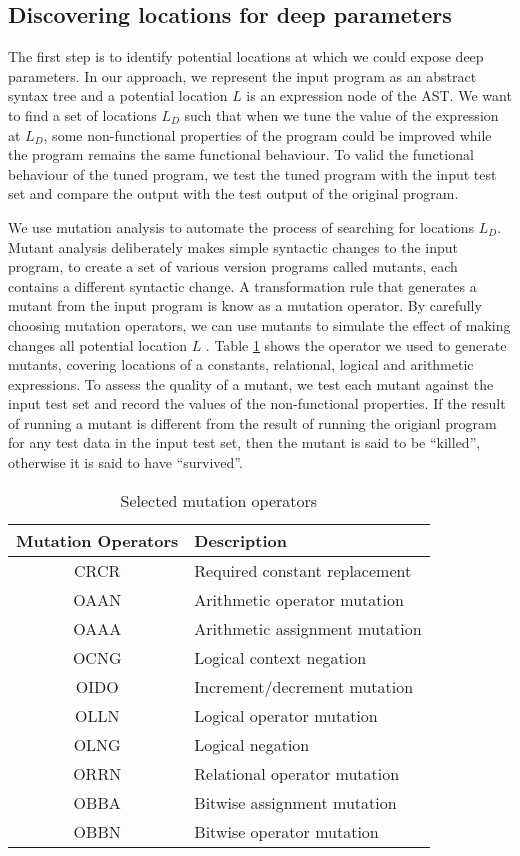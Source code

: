 
\subsection{Discovering locations for deep parameters}

The first step is to identify potential locations at which we could expose deep parameters. 
In our approach, we represent the input program as an abstract syntax tree and a potential location $L$ is an expression node of the AST. 
We want to find a set of locations $L_D$ such that when we tune the value of the expression at $L_D$, some non-functional properties of the program could be improved while the program remains the same functional behaviour. 
To valid the functional behaviour of the tuned program, we test the tuned program with the input test set and compare the output with the test output of the original program.

We use mutation analysis to automate the process of searching for locations $L_D$. Mutant analysis deliberately makes simple syntactic changes to the input program, to create a set of various version programs called mutants, each contains a different syntactic change. A transformation rule that generates a mutant from the input program is know as a mutation operator. By carefully choosing mutation operators, we can use mutants to simulate the effect of making changes all potential location $L$ . Table \ref{tab:cmop} shows the operator we used to generate mutants, covering locations of a constants, relational, logical and arithmetic expressions. 
To assess the quality of a mutant, we test each mutant against the input test set and record the values of the non-functional properties. If the result of running a mutant is different from the result of running the origianl program for any test data in the input test set, then the mutant is said to be ``killed'', otherwise it is said to have ``survived''. 

\begin{table} [htbp]
\caption{Selected mutation operators}
\label{tab:cmop} 
\begin{center}
\begin{tabular}{ | c | l |}
  \hline
  Mutation Operators & Description \\ 
\hline
  CRCR & Required constant replacement \\
  OAAN & Arithmetic operator mutation \\
  OAAA & Arithmetic assignment mutation \\
  OCNG & Logical context negation \\
  OIDO & Increment/decrement mutation  \\
  OLLN & Logical operator mutation  \\ 
  OLNG & Logical negation \\
  ORRN & Relational operator mutation \\
  OBBA & Bitwise assignment mutation \\
  OBBN & Bitwise operator mutation \\
\hline
\end{tabular} 
\end{center} 
\end{table} 

